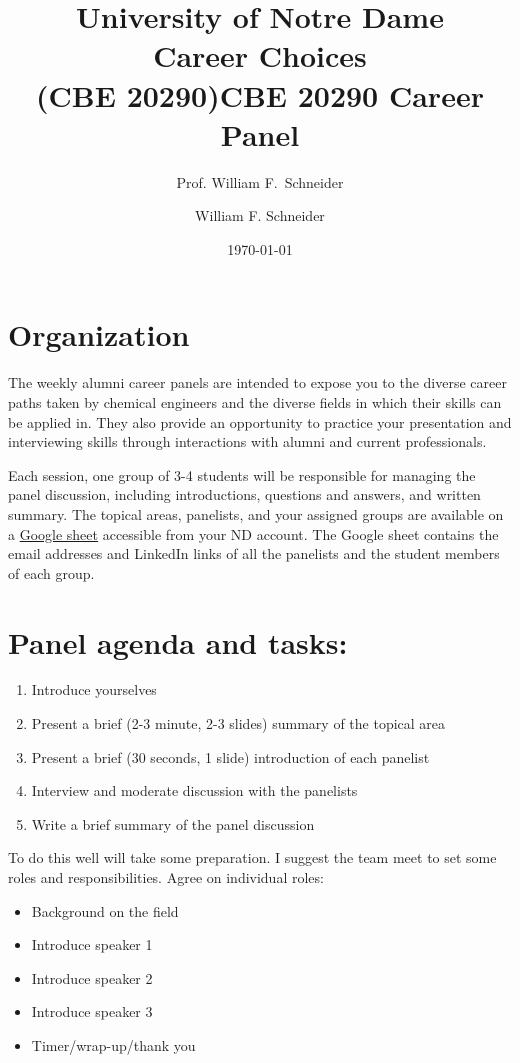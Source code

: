 \documentclass[11pt]{article}
\title{University of Notre Dame\\Career Choices\\(CBE 20290)}
\author{Prof. William F.\ Schneider}
\author{William F. Schneider}
\date{\today}
\title{CBE 20290 Career Panel}
\begin{document}
\begin{OPTIONS}
\end{OPTIONS}

\section{Organization}
\label{sec:org6ea0734}
The weekly alumni career panels are intended to expose you to the diverse career paths taken by chemical engineers and  the diverse fields in which their skills can be applied in. They also provide an opportunity to practice your presentation and interviewing skills through interactions with alumni and current professionals.

Each session, one group of 3-4 students will be responsible for managing the panel discussion, including introductions, questions and answers, and written summary. The topical areas, panelists, and your assigned groups are available on a \href{https://docs.google.com/spreadsheets/d/1UrQxN718aKtfRA056bWFxMjVzuaijhqmwvEfHE7\_juQ/edit?usp=sharing}{Google sheet} accessible from your ND account.  The Google sheet contains the email addresses and LinkedIn links of all the panelists and the student members of each group.

\section{Panel agenda and tasks:}
\label{sec:org491f4fb}
\begin{enumerate}
\item Introduce yourselves
\item Present a brief (2-3  minute, 2-3 slides) summary of the topical area
\item Present a brief (30 seconds, 1 slide) introduction of each panelist
\item Interview and moderate discussion with the panelists
\item Write a brief summary of the panel discussion
\end{enumerate}

To do this well will take some preparation. I suggest the team meet to set some roles and responsibilities.  Agree on individual roles:
\begin{itemize}
\item Background on the field
\item Introduce speaker 1
\item Introduce speaker 2
\item Introduce speaker 3
\item Timer/wrap-up/thank you
\end{itemize}
\end{document}
